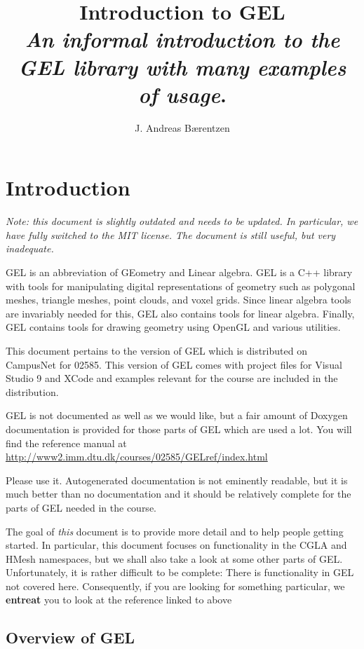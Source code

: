 \documentclass[a4paper]{article}
\author{J. Andreas B{\ae}rentzen}
\title{Introduction to GEL\\\vspace{0.25cm} \normalsize
\textit{An informal introduction to the GEL library with many examples of usage}.}
\begin{document}
\maketitle
\tableofcontents
\newpage
%
%
\section{Introduction}
%
%
\sloppy
\textit{Note: this document is slightly outdated and needs to be updated. In particular, we have fully switched to the MIT license. The document is still useful, but very inadequate.} 

GEL is an abbreviation of GEometry and Linear algebra. GEL is a C++ library with tools for manipulating digital representations of geometry such as polygonal meshes, triangle meshes, point clouds, and voxel grids. Since linear algebra tools are invariably needed for this, GEL also contains tools for linear algebra. Finally, GEL contains tools for drawing geometry using OpenGL and various utilities.

This document pertains to the version of GEL which is distributed on CampusNet for 02585. This version of GEL comes with project files for Visual Studio 9 and XCode and examples relevant for the course are included in the distribution.

GEL is not documented as well as we would like, but a fair amount of Doxygen documentation is provided for those parts of GEL which are used a lot. You will find the reference manual at \href{http://www2.imm.dtu.dk/courses/02585/GELref/index.html}{http://www2.imm.dtu.dk/courses/02585/GELref/index.html}

Please use it. Autogenerated documentation is not eminently readable, but it is much better than no documentation and it should be relatively complete for the parts of GEL needed in the course. 

The goal of \textit{this} document is to provide more detail and to help people getting started. In particular, this document focuses on functionality in the CGLA and HMesh namespaces, but we shall also take a look at some other parts of GEL. Unfortunately, it is rather difficult to be complete: There is functionality in GEL not covered here. Consequently, if you are looking for something particular, we \textbf{entreat } you to look at the reference linked to above
\subsection{Overview of GEL}
\end{document}
